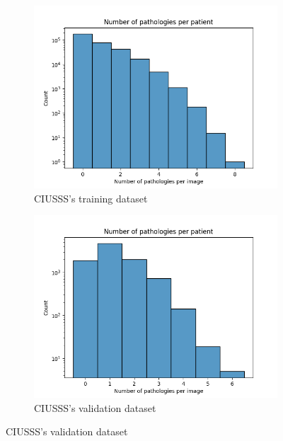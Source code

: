 \documentclass[11pt]{article}
\begin{document}
\begin{figure}[!h]
     \centering
     \begin{subfigure}[b]{0.45\linewidth}
         \centering
         \includegraphics[width=\linewidth]{plots/disease_count_ciusss_train}
         \caption{CIUSSS's training dataset}
         \vspace{4ex}
         \label{fig:count_ciusss_train}
     \end{subfigure}
     \hfill
     \begin{subfigure}[b]{0.45\linewidth}
         \centering
         \includegraphics[width=\linewidth]{plots/disease_count_ciusss_valid}
         \caption{CIUSSS's validation dataset}
         \vspace{4ex}
         \label{fig:count_ciusss_valid}
     \end{subfigure}



\end{figure}
\end{document}
